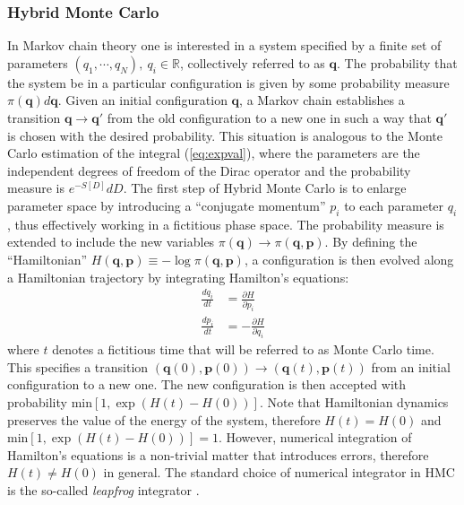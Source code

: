 \subsubsection{Hybrid Monte Carlo}
In Markov chain theory one is interested in a system specified by a finite set of parameters $(q_1, \cdots, q_N), \ q_i \in \mathbb{R}$, collectively referred to as $\mathbf{q}$. The probability that the system be in a particular configuration is given by some probability measure $\pi (\mathbf{q}) d\mathbf{q}$. Given an initial configuration $\mathbf{q}$, a Markov chain establishes a transition $\mathbf{q} \rightarrow \mathbf{q}'$ from the old configuration to a new one in such a way that $\mathbf{q}'$ is chosen with the desired probability.\newline 
This situation is analogous to the Monte Carlo estimation of the integral (\ref{eq:expval}), where the parameters are the independent degrees of freedom of the Dirac operator and the probability measure is $e^{-S[D]}dD$.\newline
The first step of Hybrid Monte Carlo is to enlarge parameter space by introducing a ``conjugate momentum'' $p_i$ to each parameter $q_i$, thus effectively working in a fictitious phase space. The probability measure is extended to include the new variables $\pi (\mathbf{q}) \rightarrow \pi (\mathbf{q}, \mathbf{p})$. By defining the ``Hamiltonian'' $H(\mathbf{q}, \mathbf{p}) \equiv -\log \pi (\mathbf{q}, \mathbf{p})$, a configuration is then evolved along a Hamiltonian trajectory by integrating Hamilton's equations:
\begin{align}
\frac{dq_i}{dt} &= \frac{\partial{H}}{\partial{p_i}} \label{eq:dqdt} \\
\frac{dp_i}{dt} &= -\frac{\partial{H}}{\partial{q_i}} \label{eq:dpdt}
\end{align}
where $t$ denotes a fictitious time that will be referred to as Monte Carlo time. This specifies a transition $(\mathbf{q}(0), \mathbf{p}(0)) \rightarrow (\mathbf{q}(t), \mathbf{p}(t))$ from an initial configuration to a new one. The new configuration is then accepted with probability $\text{min}[1, \exp (H(t)-H(0))]$. \newline
Note that Hamiltonian dynamics preserves the value of the energy of the system, therefore $H(t) = H(0)$ and $\text{min}[1, \exp (H(t)-H(0))] = 1$. However, numerical integration of Hamilton's equations is a non-trivial matter that introduces errors, therefore $H(t) \neq H(0)$ in general. The standard choice of numerical integrator in HMC is the so-called \textit{leapfrog} integrator \cite{betan} \cite{neal}.

